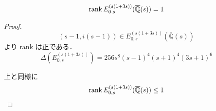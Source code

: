 \documentclass[main]{subfiles}
\begin{document}
\begin{thm}
    \begin{equation}
        \operatorname{rank} E_{0,s}^{(s(1 + 3s))}(\overline{\mathbb{Q}}(s)) = 1
    \end{equation}
\end{thm}
\begin{proof}
    \begin{equation}
        (s - 1, i(s - 1)) \in E_{0,s}^{(s(1 + 3s))}(\overline{\mathbb{Q}}(s))
    \end{equation}
    より rank は正である．
    \begin{equation}
        \Delta(E_{0,s}^{(s(1 + 3s))}) = 256s^{8}(s - 1)^{4}(s + 1)^{4}(3s + 1)^{6}
    \end{equation}
    
    上と同様に
    \begin{equation}
        \operatorname{rank} E_{0,s}^{(s(1 + 3s))}(\overline{\mathbb{Q}}(s)) \leq 1
    \end{equation}
\end{proof}
\end{document}

